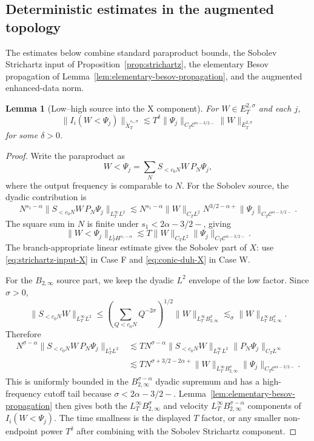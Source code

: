 \documentclass[10pt]{amsart}
\numberwithin{equation}{section}
\theoremstyle{plain}
\newtheorem{lemma}[theorem]{Lemma}
\theoremstyle{definition}
\theoremstyle{remark}
\newcommand{\C}{\mathcal{C}}
\newcommand{\Btwo}{B_{2,\infty}}
\begin{document}
\subsection{Deterministic estimates in the augmented topology}
The estimates below combine standard paraproduct bounds, the Sobolev Strichartz input of Proposition~\ref{prop:strichartz}, the elementary Besov propagation of Lemma~\ref{lem:elementary-besov-propagation}, and the augmented enhanced-data norm.

\begin{lemma}[Low--high source into the X component]\label{lem:lowhigh-X}
For $W\in E_T^{2,\sigma}$ and each $j$,
\begin{equation}\label{eq:lowhigh-X-estimate}
\|I_i(W<\Psi_j)\|_{\widetilde X_T^{s_1,\sigma}}
\lesssim T^\delta
\|\Psi_j\|_{C_T\C^{\alpha-3/2-}}
\|W\|_{E_T^{2,\sigma}}
\end{equation}
for some $\delta>0$.
\end{lemma}

\begin{proof}
Write the paraproduct as
\[
        W<\Psi_j=\sum_N S_{<c_0N}W\,P_N\Psi_j,
\]
where the output frequency is comparable to $N$.  For the Sobolev source, the dyadic contribution is
\[
 N^{s_1-\alpha}
 \|S_{<c_0N}W\,P_N\Psi_j\|_{L_T^\infty L^2}
 \lesssim
 N^{s_1-\alpha}\|W\|_{C_TL^2}
 N^{3/2-\alpha+}\|\Psi_j\|_{C_T\C^{\alpha-3/2-}}.
\]
The square sum in $N$ is finite under $s_1<2\alpha-3/2-$, giving
\[
 \|W<\Psi_j\|_{L_T^1H^{s_1-\alpha}}
 \lesssim
 T\|W\|_{C_TL^2}\|\Psi_j\|_{C_T\C^{\alpha-3/2-}}.
\]
The branch-appropriate linear estimate gives the Sobolev part of $X$: use \eqref{eq:strichartz-input-X} in Case F and \eqref{eq:conic-duh-X} in Case W.

For the $B_{2,\infty}$ source part, we keep the dyadic $L^2$ envelope of the low factor.  Since $\sigma>0$,
\[
        \|S_{<c_0N}W\|_{L_T^\infty L^2}
        \le \left(\sum_{Q<c_0N}Q^{-2\sigma}\right)^{1/2}
        \|W\|_{L_T^\infty\Btwo^\sigma}
        \lesssim_\sigma \|W\|_{L_T^\infty\Btwo^\sigma}.
\]
Therefore
\begin{align*}
 N^{\sigma-\alpha}\|S_{<c_0N}W\,P_N\Psi_j\|_{L_T^1L^2}
 &\lesssim
 T N^{\sigma-\alpha}\|S_{<c_0N}W\|_{L_T^\infty L^2}
        \|P_N\Psi_j\|_{C_TL^\infty}\\
 &\lesssim
 T N^{\sigma+3/2-2\alpha+}
 \|W\|_{L_T^\infty\Btwo^\sigma}
 \|\Psi_j\|_{C_T\C^{\alpha-3/2-}}.
\end{align*}
This is uniformly bounded in the $B_{2,\infty}^{\sigma-\alpha}$ dyadic supremum and has a high-frequency cutoff tail because $\sigma<2\alpha-3/2-$.  Lemma~\ref{lem:elementary-besov-propagation} then gives both the $L_T^\infty\Btwo^\sigma$ and velocity $L_T^\infty\Btwo^{\sigma-\alpha}$ components of $I_i(W<\Psi_j)$.  The time smallness is the displayed $T$ factor, or any smaller non-endpoint power $T^\delta$ after combining with the Sobolev Strichartz component.
\end{proof}
\end{document}
